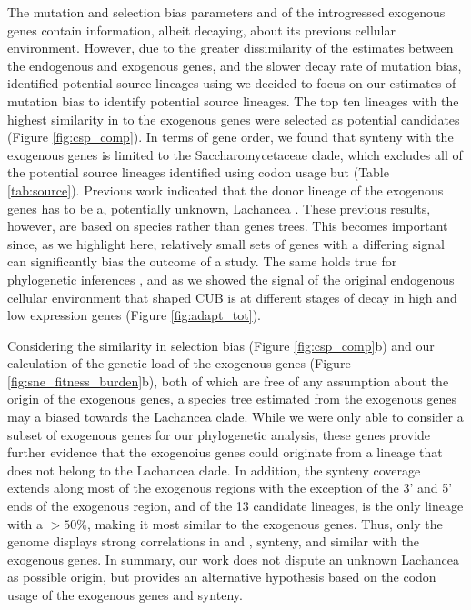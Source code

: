 \documentclass[fleqn,letterpaper]{article}
\begin{document}
The mutation and selection bias parameters \DM and \DE of the introgressed exogenous genes contain information, albeit decaying, about its previous cellular environment.
However, due to the greater dissimilarity of the \DM estimates between the endogenous and exogenous genes, and the slower decay rate of mutation bias, identified potential source lineages using \DM we decided to focus on our estimates of mutation bias to identify potential source lineages.
The top ten lineages with the highest similarity in \DM to the exogenous genes were selected as potential candidates (Figure \ref{fig:csp_comp}).
In terms of gene order, we found that synteny with the exogenous genes is limited to the Saccharomycetaceae clade, which excludes all of the potential source lineages identified using codon usage but \gossypii (Table \ref{tab:source}).
Previous work indicated that the donor lineage of the exogenous genes has to be a, potentially unknown, Lachancea \citep{payen2009, vakirlis2016}.
These previous results, however, are based on species rather than genes trees. 
This becomes important since, as we highlight here, relatively small sets of genes with a differing signal can significantly bias the outcome of a study. 
The same holds true for phylogenetic inferences \citep{salichos2013}, and as we showed the signal of the original endogenous cellular environment that shaped CUB is at different stages of decay in high and low expression genes (Figure \ref{fig:adapt_tot}).

Considering the similarity in selection bias (Figure \ref{fig:csp_comp}b) and our calculation of the genetic load of the exogenous genes (Figure \ref{fig:sne_fitness_burden}b), both of which are free of any assumption about the origin of the exogenous genes, a species tree estimated from the exogenous genes may a biased towards the Lachancea clade.
While we were only able to consider a subset of exogenous genes for our phylogenetic analysis, these genes provide further evidence that the exogenoius genes could originate from a lineage that does not belong to the Lachancea clade.
In addition, the synteny coverage extends along most of the exogenous regions with the exception of the 3' and 5' ends of the exogenous region, and of the 13 candidate lineages, \gossypii is the only lineage with a \GC $> 50 \%$, making it most similar to the exogenous genes.
Thus, only the \gossypii genome displays strong correlations in \DM and \DE, synteny, and similar \GC  with the exogenous genes.
In summary, our work does not dispute an unknown Lachancea as possible origin, but provides an alternative hypothesis based on the codon usage of the exogenous genes and synteny.
\end{document}
